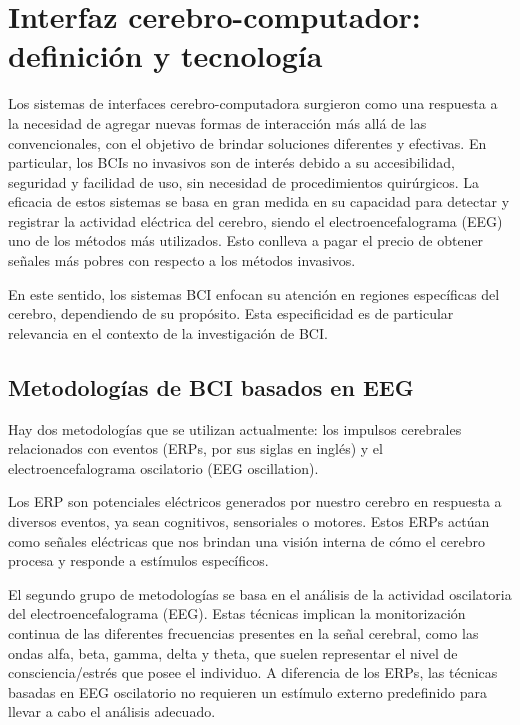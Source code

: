 \section{Interfaz cerebro-computador: definición y tecnología}

Los sistemas de interfaces cerebro-computadora surgieron como una respuesta a la necesidad de agregar nuevas formas de interacción más allá de las convencionales, con el objetivo de brindar soluciones diferentes y efectivas. En particular, los BCIs no invasivos son de interés debido a su accesibilidad, seguridad y facilidad de uso, sin necesidad de procedimientos quirúrgicos. La eficacia de estos sistemas se basa en gran medida en su capacidad para detectar y registrar la actividad eléctrica del cerebro, siendo el electroencefalograma (EEG) uno de los métodos más utilizados. Esto conlleva a pagar el precio de obtener señales más pobres con respecto a los métodos invasivos.



En este sentido, los sistemas BCI enfocan su atención en regiones específicas del cerebro, dependiendo de su propósito. Esta especificidad es de particular relevancia en el contexto de la investigación de BCI.

\subsection{Metodologías de BCI basados en EEG}

Hay dos metodologías que se utilizan actualmente: los impulsos cerebrales relacionados con eventos (ERPs, por sus siglas en inglés) y el electroencefalograma oscilatorio (EEG oscillation).



Los ERP son potenciales eléctricos generados por nuestro cerebro en respuesta a diversos eventos, ya sean cognitivos, sensoriales o motores. Estos ERPs actúan como señales eléctricas que nos brindan una visión interna de cómo el cerebro procesa y responde a estímulos específicos.



El segundo grupo de metodologías se basa en el análisis de la actividad oscilatoria del electroencefalograma (EEG). Estas técnicas implican la monitorizaci\'on continua de las diferentes frecuencias presentes en la señal cerebral, como las ondas alfa, beta, gamma, delta y theta, que suelen representar el nivel de consciencia/estrés que posee el individuo\cite{ABHANG201619}. A diferencia de los ERPs, las técnicas basadas en EEG oscilatorio no requieren un estímulo externo predefinido para llevar a cabo el análisis adecuado.



